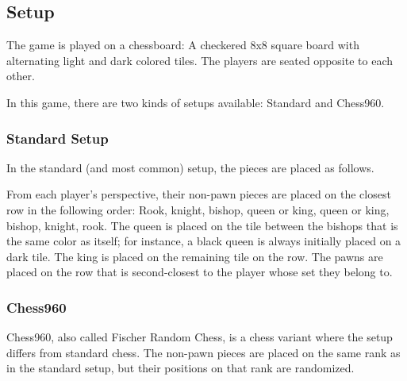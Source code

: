 \documentclass[12pt, a4paper]{article}
\begin{document}
\subsection{Setup}
The game is played on a chessboard: A checkered 8x8 square board with alternating light and dark colored tiles. The players are seated opposite to each other.

In this game, there are two kinds of setups available: Standard and Chess960.

\subsubsection{Standard Setup} 
In the standard (and most common) setup, the pieces are placed as follows.

From each player’s perspective, their non-pawn pieces are placed on the closest row in the following order: Rook, knight, bishop, queen or king, queen or king, bishop, knight, rook. The queen is placed on the tile between the bishops that is the same color as itself; for instance, a black queen is always initially placed on a dark tile. The king is placed on the remaining tile on the row. The pawns are placed on the row that is second-closest to the player whose set they belong to.

\subsubsection{Chess960}

Chess960, also called Fischer Random Chess, is a chess variant where the setup differs from standard chess. The non-pawn pieces are placed on the same rank as in the standard setup, but their positions on that rank are randomized.
\end{document}
